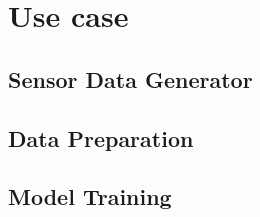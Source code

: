\chapter{Use case}
\label{cha:789}
\section{Sensor Data Generator}
\section{Data Preparation}
\section{Model Training}
